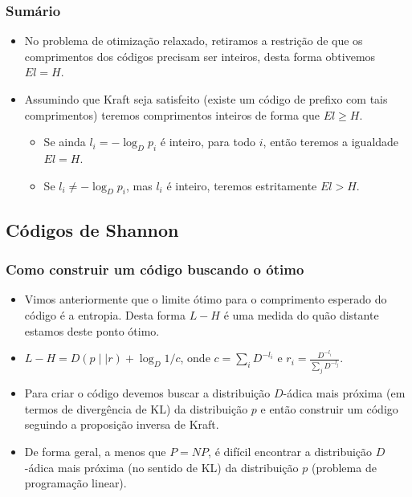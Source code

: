 \begin{frame}[allowframebreaks]
  \frametitle{Sumário}
  \begin{itemize}
  \item No problema de otimização relaxado, retiramos a restrição de que os comprimentos dos códigos
	precisam ser inteiros, desta forma obtivemos $E l = H$.
  \item Assumindo que Kraft seja satisfeito (existe um código de prefixo com tais comprimentos)
	teremos comprimentos inteiros de forma que $E l \geq H$. 
	\begin{itemize}
	\item Se ainda $l_i = -\log_D p_i$ é
	inteiro, para todo $i$, então teremos a igualdade $E l = H$. 
	\item Se $l_i \neq -\log_D p_i$, mas $l_i$ é inteiro, teremos estritamente $E l > H$.
	\end{itemize}
  \end{itemize}
\end{frame}


\subsection{Códigos de Shannon}
\begin{frame}[allowframebreaks]
  \frametitle{Como construir um código buscando o ótimo}
  \begin{itemize}
  \item Vimos anteriormente que o limite ótimo para o comprimento esperado do código é a entropia. Desta forma
	$L-H$ é uma medida do quão distante estamos deste ponto ótimo.
  \item $L-H = D(p \mid \mid r) + \log_D 1/c$, onde $c = \sum_i D^{-l_i}$ e $r_i = \frac{D^{-l_i}}{\sum_j D^{-l_j}}$.
  \item Para criar o código devemos buscar a distribuição $D$-ádica mais próxima (em termos de divergência de KL)
	da distribuição $p$ e então construir um código seguindo a proposição inversa de Kraft.
  \item De forma geral, a menos que $P=NP$, é difícil encontrar a distribuição $D$-ádica mais próxima (no sentido de KL)
	da distribuição $p$ (problema de programação linear).
  \end{itemize}
\end{frame}


